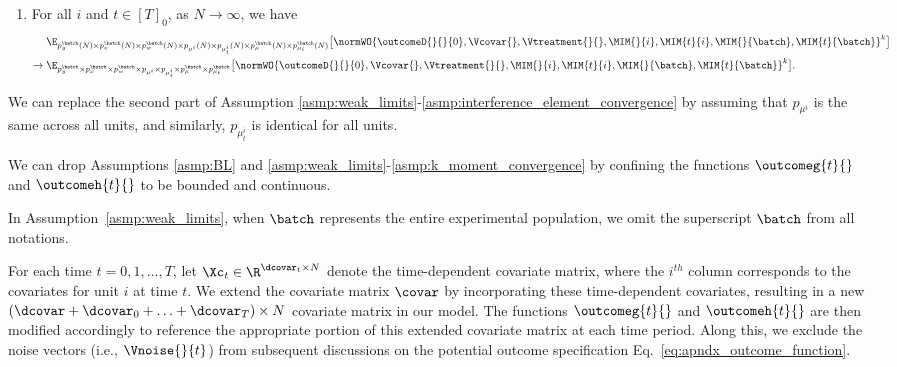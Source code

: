 \begin{assumption}
\begin{enumerate}[label=(\roman*)]
        \item \label{asmp:k_moment_convergence} For all $i$ and $t\in [T]_0$, as $N \rightarrow \infty$, we have
        \begin{align*}
            &\;\E_{p_{y}^{\batch}(N) \times p_{x}^{\batch}(N) \times p_{w}^{\batch}(N) \times p_{\mu^i}(N) \times p_{\mu_t^i}(N) \times p_{\mu}^{\batch}(N) \times p_{\mu_t}^{\batch}(N)} \big[\normWO{\outcomeD{}{}{0},\Vcovar{}, \Vtreatment{}{}, \MIM{}{i}, \MIM{t}{i}, \MIM{}{\batch}, \MIM{t}{\batch}}^k\big]
            \\
            \rightarrow
            &\;\E_{p_{y}^{\batch} \times p_{x}^{\batch} \times p_{w}^{\batch} \times p_{\mu^i} \times p_{\mu^i_t} \times p_{\mu}^{\batch} \times p_{\mu_t}^{\batch}}\big[\normWO{\outcomeD{}{}{0},\Vcovar{}, \Vtreatment{}{}, \MIM{}{i}, \MIM{t}{i}, \MIM{}{\batch}, \MIM{t}{\batch}}^k\big].
        \end{align*}
    \end{enumerate}
\end{assumption}
% 
\begin{remark}
    We can replace the second part of Assumption \ref{asmp:weak_limits}-\ref{asmp:interference_element_convergence} by assuming that $p_{\mu^i}$ is the same across all units, and similarly, $p_{\mu^i_t}$ is identical for all units.
\end{remark}
% 
\begin{remark}
    We can drop Assumptions \ref{asmp:BL} and \ref{asmp:weak_limits}-\ref{asmp:k_moment_convergence} by confining the functions $\outcomeg{t}{}$ and $\outcomeh{t}{}$ to be bounded and continuous.
\end{remark}
% 
\begin{remark}
    In Assumption~\ref{asmp:weak_limits}, when $\batch$ represents the entire experimental population, we omit the superscript $\batch$ from all notations.
\end{remark}
% 
\begin{remark}
    For each time $t = 0, 1, \ldots, T$, let $\Xc_t \in \R^{\dcovar_t \times N}$ denote the time-dependent covariate matrix, where the $i^{th}$ column corresponds to the covariates for unit $i$ at time $t$. We extend the covariate matrix $\covar$ by incorporating these time-dependent covariates, resulting in a new $(\dcovar + \dcovar_0 + \ldots + \dcovar_T) \times N$ covariate matrix in our model. The functions $\outcomeg{t}{}$ and $\outcomeh{t}{}$ are then modified accordingly to reference the appropriate portion of this extended covariate matrix at each time period. Along this, we exclude the noise vectors (i.e., $\Vnoise{}{t}$) from subsequent discussions on the potential outcome specification Eq.~\eqref{eq:apndx_outcome_function}.
\end{remark}
